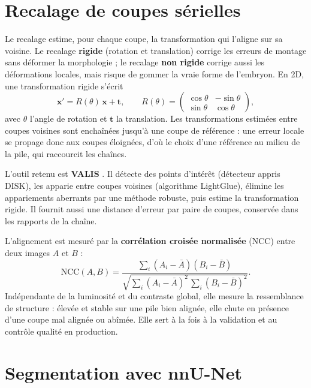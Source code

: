 \documentclass[12pt,a4paper]{report}
\begin{document}
\section{Recalage de coupes sérielles}

Le recalage estime, pour chaque coupe, la transformation qui l'aligne sur sa voisine. Le recalage \textbf{rigide} (rotation et translation) corrige les erreurs de montage sans déformer la morphologie ; le recalage \textbf{non rigide} corrige aussi les déformations locales, mais risque de gommer la vraie forme de l'embryon. En 2D, une transformation rigide s'écrit
\begin{equation}
\mathbf{x}' = R(\theta)\,\mathbf{x} + \mathbf{t},
\qquad
R(\theta)=\begin{pmatrix}\cos\theta & -\sin\theta\\ \sin\theta & \cos\theta\end{pmatrix},
\end{equation}
avec $\theta$ l'angle de rotation et $\mathbf{t}$ la translation. Les transformations estimées entre coupes voisines sont enchaînées jusqu'à une coupe de référence : une erreur locale se propage donc aux coupes éloignées, d'où le choix d'une référence au milieu de la pile, qui raccourcit les chaînes.

L'outil retenu est \textbf{VALIS} \cite{gatenby2023}. Il détecte des points d'intérêt (détecteur appris DISK), les apparie entre coupes voisines (algorithme LightGlue), élimine les appariements aberrants par une méthode robuste, puis estime la transformation rigide. Il fournit aussi une distance d'erreur par paire de coupes, conservée dans les rapports de la chaîne.

L'alignement est mesuré par la \textbf{corrélation croisée normalisée} (NCC) entre deux images $A$ et $B$ :
\begin{equation}
\mathrm{NCC}(A,B)=\frac{\sum_{i}(A_i-\bar A)(B_i-\bar B)}{\sqrt{\sum_{i}(A_i-\bar A)^2\,\sum_{i}(B_i-\bar B)^2}} .
\end{equation}
Indépendante de la luminosité et du contraste global, elle mesure la ressemblance de structure : élevée et stable sur une pile bien alignée, elle chute en présence d'une coupe mal alignée ou abîmée. Elle sert à la fois à la validation et au contrôle qualité en production.

\section{Segmentation avec nnU-Net}
\end{document}
